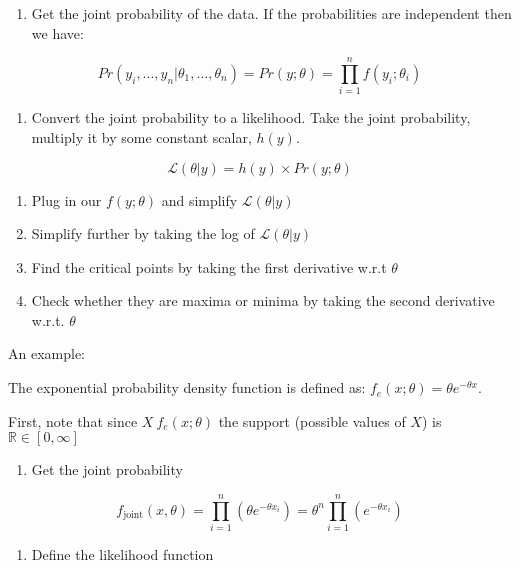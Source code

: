 \documentclass[
]{article}
\providecommand{\tightlist}{%
  \setlength{\itemsep}{0pt}\setlength{\parskip}{0pt}}
\begin{document}
\begin{enumerate}
\def\labelenumi{\arabic{enumi}.}
\tightlist
\item
  Get the joint probability of the data. If the probabilities are
  independent then we have:
\end{enumerate}

\[Pr(y_i,. . ., y_n|\theta_1, . . ., \theta_n)=Pr(y;\theta)=\prod_{i=1}^nf(y_i;\theta_i)\]

\begin{enumerate}
\def\labelenumi{\arabic{enumi}.}
\setcounter{enumi}{1}
\tightlist
\item
  Convert the joint probability to a likelihood. Take the joint
  probability, multiply it by some constant scalar, \(h(y)\).
\end{enumerate}

\[\mathcal{L}(\theta|y)=h(y)\times Pr(y;\theta)\]

\begin{enumerate}
\def\labelenumi{\arabic{enumi}.}
\setcounter{enumi}{2}
\item
  Plug in our \(f(y;\theta)\) and simplify \(\mathcal{L}(\theta|y)\)
\item
  Simplify further by taking the log of \(\mathcal{L}(\theta|y)\)
\item
  Find the critical points by taking the first derivative w.r.t
  \(\theta\)
\item
  Check whether they are maxima or minima by taking the second
  derivative w.r.t. \(\theta\)
\end{enumerate}

An example:

The exponential probability density function is defined as:
\(f_e(x;\theta)=\theta e^{-\theta x}\).

First, note that since \(X~f_e(x;\theta)\) the support (possible values
of \(X\)) is \(\mathbb{R}\in [0, \infty]\)

\begin{enumerate}
\def\labelenumi{\arabic{enumi}.}
\tightlist
\item
  Get the joint probability
\end{enumerate}

\[f_{\mathrm{joint}}(x,\theta)=\prod_{i=1}^n(\theta e^{-\theta x_i})=\theta^n\prod_{i=1}^n( e^{-\theta x_i})\]

\begin{enumerate}
\def\labelenumi{\arabic{enumi}.}
\setcounter{enumi}{1}
\tightlist
\item
  Define the likelihood function
\end{enumerate}
\end{document}
